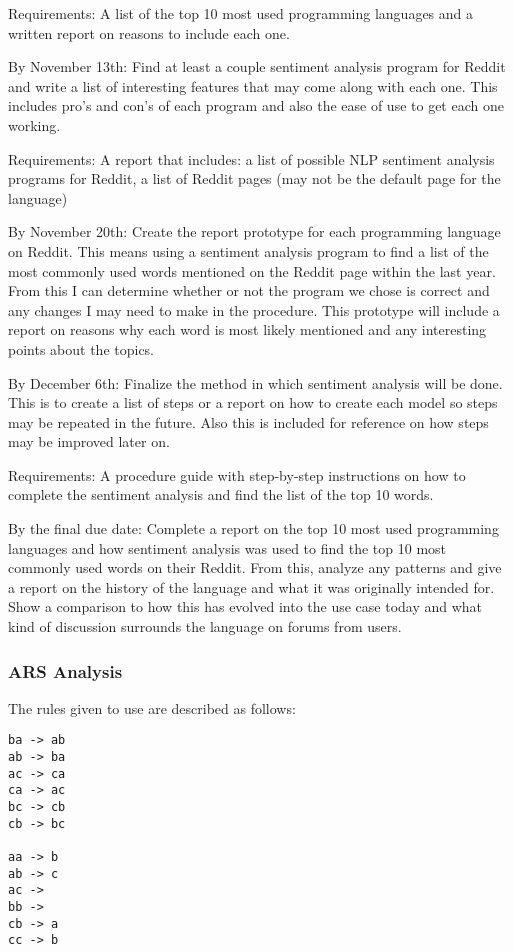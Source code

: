 \documentclass{article}
\theoremstyle{theorem}
\theoremstyle{definition}
\theoremstyle{remark}
\begin{document}
\noindent
Requirements: A list of the top 10 most used programming languages and a written report on reasons to include each one.

\medskip
By November 13th: Find at least a couple sentiment analysis program for Reddit and write a list of interesting features that may come along with each one. This includes pro's and con's of each program and also the ease of use to get each one working.

\noindent
Requirements: A report that includes: a list of possible NLP sentiment analysis programs for Reddit, a list of Reddit pages (may not be the default page for the language) 

\medskip
By November 20th: Create the report prototype for each programming language on Reddit. This means using a sentiment analysis program to find a list of the most commonly used words mentioned on the Reddit page within the last year. From this I can determine whether or not the program we chose is correct and any changes I may need to make in the procedure. This prototype will include a report on reasons why each word is most likely mentioned and any interesting points about the topics.

\medskip
By December 6th: Finalize the method in which sentiment analysis will be done. This is to create a list of steps or a report on how to create each model so steps may be repeated in the future. Also this is included for reference on how steps may be improved later on.

\noindent
Requirements: A procedure guide with step-by-step instructions on how to complete the sentiment analysis and find the list of the top 10 words.

\medskip
By the final due date: Complete a report on the top 10 most used programming languages and how sentiment analysis was used to find the top 10 most commonly used words on their Reddit. From this, analyze any patterns and give a report on the history of the language and what it was originally intended for. Show a comparison to how this has evolved into the use case today and what kind of discussion surrounds the language on forums from users.

\subsubsection{ARS Analysis}
The rules given to use are described as follows:
\begin{lstlisting}
ba -> ab
ab -> ba
ac -> ca
ca -> ac
bc -> cb
cb -> bc
 
aa -> b
ab -> c
ac ->  
bb ->
cb -> a
cc -> b
\end{lstlisting}
\end{document}

